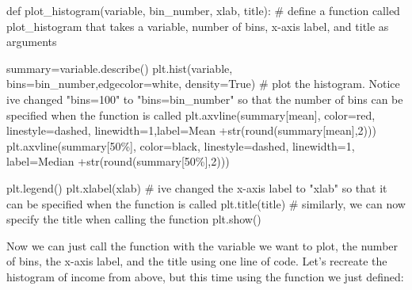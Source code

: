 \documentclass[
  letterpaper,
  DIV=11,
  numbers=noendperiod]{scrreprt}
\newenvironment{Shaded}{\begin{snugshade}}{\end{snugshade}}
\newcommand{\BuiltInTok}[1]{\textcolor[rgb]{0.00,0.23,0.31}{#1}}
\newcommand{\CommentTok}[1]{\textcolor[rgb]{0.37,0.37,0.37}{#1}}
\newcommand{\DecValTok}[1]{\textcolor[rgb]{0.68,0.00,0.00}{#1}}
\newcommand{\KeywordTok}[1]{\textcolor[rgb]{0.00,0.23,0.31}{#1}}
\newcommand{\NormalTok}[1]{\textcolor[rgb]{0.00,0.23,0.31}{#1}}
\newcommand{\OperatorTok}[1]{\textcolor[rgb]{0.37,0.37,0.37}{#1}}
\newcommand{\StringTok}[1]{\textcolor[rgb]{0.13,0.47,0.30}{#1}}
\newcommand{\VariableTok}[1]{\textcolor[rgb]{0.07,0.07,0.07}{#1}}
\begin{document}
\begin{Shaded}
\begin{Highlighting}[]
\KeywordTok{def}\NormalTok{ plot\_histogram(variable, bin\_number, xlab, title): }\CommentTok{\# define a function called plot\_histogram that takes a variable, number of bins, x{-}axis label, and title as arguments}
    
\NormalTok{    summary}\OperatorTok{=}\NormalTok{variable.describe()     }
\NormalTok{    plt.hist(variable, bins}\OperatorTok{=}\NormalTok{bin\_number,edgecolor}\OperatorTok{=}\StringTok{\textquotesingle{}white\textquotesingle{}}\NormalTok{, density}\OperatorTok{=}\VariableTok{True}\NormalTok{) }\CommentTok{\# plot the histogram. Notice i\textquotesingle{}ve changed "bins=100" to "bins=bin\_number" so that the number of bins can be specified when the function is called}
\NormalTok{    plt.axvline(summary[}\StringTok{\textquotesingle{}mean\textquotesingle{}}\NormalTok{], color}\OperatorTok{=}\StringTok{\textquotesingle{}red\textquotesingle{}}\NormalTok{, linestyle}\OperatorTok{=}\StringTok{\textquotesingle{}dashed\textquotesingle{}}\NormalTok{, linewidth}\OperatorTok{=}\DecValTok{1}\NormalTok{,label}\OperatorTok{=}\StringTok{\textquotesingle{}Mean \textquotesingle{}}\OperatorTok{+}\BuiltInTok{str}\NormalTok{(}\BuiltInTok{round}\NormalTok{(summary[}\StringTok{\textquotesingle{}mean\textquotesingle{}}\NormalTok{],}\DecValTok{2}\NormalTok{)))}
\NormalTok{    plt.axvline(summary[}\StringTok{\textquotesingle{}50\%\textquotesingle{}}\NormalTok{], color}\OperatorTok{=}\StringTok{\textquotesingle{}black\textquotesingle{}}\NormalTok{, linestyle}\OperatorTok{=}\StringTok{\textquotesingle{}dashed\textquotesingle{}}\NormalTok{, linewidth}\OperatorTok{=}\DecValTok{1}\NormalTok{, label}\OperatorTok{=}\StringTok{\textquotesingle{}Median \textquotesingle{}}\OperatorTok{+}\BuiltInTok{str}\NormalTok{(}\BuiltInTok{round}\NormalTok{(summary[}\StringTok{\textquotesingle{}50\%\textquotesingle{}}\NormalTok{],}\DecValTok{2}\NormalTok{)))}

\NormalTok{    plt.legend()}
\NormalTok{    plt.xlabel(xlab) }\CommentTok{\# i\textquotesingle{}ve changed the x{-}axis label to "xlab" so that it can be specified when the function is called}
\NormalTok{    plt.title(title) }\CommentTok{\# similarly, we can now specify the title when calling the function}
\NormalTok{    plt.show()}
\end{Highlighting}
\end{Shaded}

Now we can just call the function with the variable we want to plot, the
number of bins, the x-axis label, and the title using one line of code.
Let's recreate the histogram of income from above, but this time using
the function we just defined:
\end{document}
